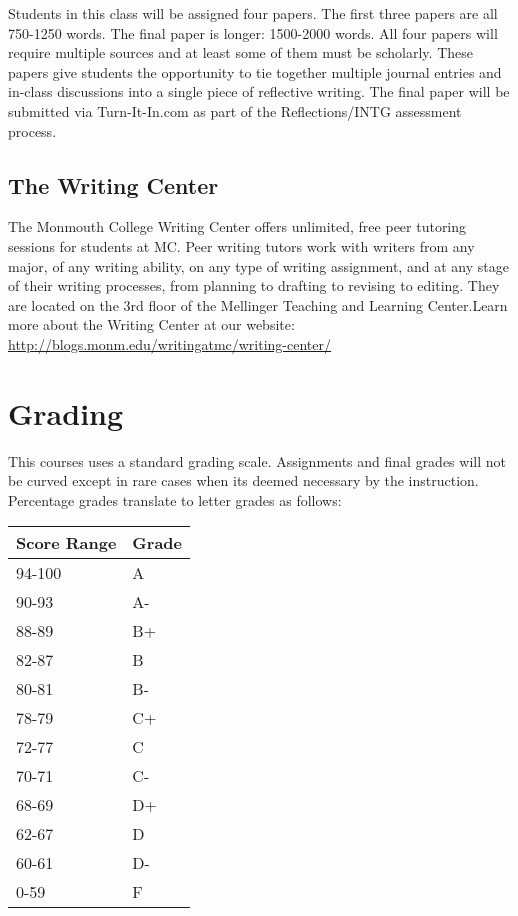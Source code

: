 \documentclass[nobib]{tufte-handout}
\begin{document}
Students in this class will be  assigned four papers. The first three papers are all 750-1250 words. The final paper is longer: 1500-2000 words. All four papers will require multiple sources and at least some of them must be scholarly. These papers give students the opportunity to tie together multiple journal entries and in-class discussions into a single piece of reflective writing. The final paper will be submitted via Turn-It-In.com as part of the Reflections/INTG assessment process. 

\subsection{The Writing Center}

The Monmouth College Writing Center offers unlimited, free peer tutoring sessions for students at MC.  Peer writing tutors work with writers from any major, of any writing ability, on any type of writing assignment, and at any stage of their writing processes, from planning to drafting to revising to editing.  They are located on the 3rd floor of the Mellinger Teaching and Learning Center.Learn more about the Writing Center at our website: \url{http://blogs.monm.edu/writingatmc/writing-center/}

\section{Grading}

This courses uses a standard grading scale.  Assignments and final grades will not be curved except in rare cases when its deemed necessary by the instruction.  Percentage grades translate to letter grades as follows:
\newline
\begin{center}
\begin{small}
\begin{tabular}{ll}
Score Range & Grade \\ \hline
94-100 & A \\
90-93 & A- \\
88-89 & B+ \\
82-87 & B \\
80-81 & B- \\
78-79 & C+ \\
72-77 & C \\
70-71 & C- \\
68-69 & D+ \\
62-67 & D \\
60-61 & D- \\
0-59 & F 
\end{tabular}
\end{small}
\end{center}
\end{document}
